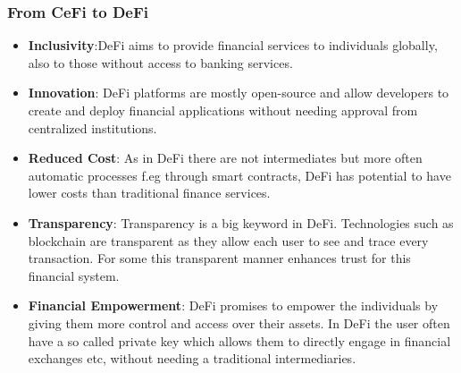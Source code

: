 \documentclass{article}
\begin{document}
\subsubsection{From CeFi to DeFi}
\begin{itemize}
    \item \textbf{Inclusivity}:DeFi aims to provide financial services to individuals globally, also to those without access to banking services.
    \item \textbf{Innovation}: DeFi platforms are mostly open-source and allow developers to create and deploy financial applications without needing approval from centralized institutions.
    \item \textbf{Reduced Cost}: As in DeFi there are not intermediates but more often automatic processes f.eg through smart contracts, DeFi has potential to have lower costs than traditional finance services.
    \item \textbf{Transparency}: Transparency is a big keyword in DeFi. Technologies such as blockchain are transparent as they allow each user to see and trace every transaction. For some this transparent manner enhances trust for this financial system.
    \item \textbf{Financial Empowerment}: DeFi promises to empower the individuals by giving them more control and access over their assets. In DeFi the user often have a so called private key which allows them to directly engage in financial exchanges etc, without needing a traditional intermediaries.
\end{itemize}
\end{document}
